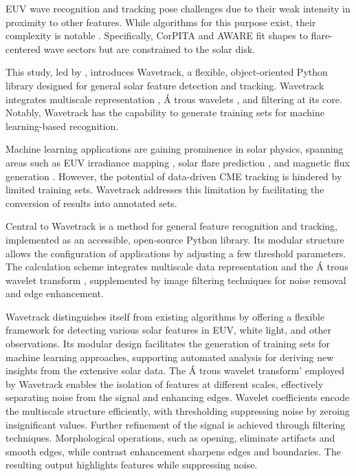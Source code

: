 EUV wave recognition and tracking pose challenges due to their weak intensity in proximity to other features. While algorithms for this purpose exist, their complexity is notable \citep{podladchikova_2005, verbeeck_2014, long_2014, ireland_2019}. Specifically, CorPITA \citep{long_2014} and AWARE \citep{ireland_2019} fit shapes to flare-centered wave sectors but are constrained to the solar disk.

This study, led by \citet{stepanyuk_2022}, introduces Wavetrack, a flexible, object-oriented Python library designed for general solar feature detection and tracking. Wavetrack integrates multiscale representation \citep{starck_2002}, \'A trous wavelets \citep{akansu_1991, holschneider_1989}, and filtering at its core. Notably, Wavetrack has the capability to generate training sets for machine learning-based recognition.

Machine learning applications are gaining prominence in solar physics, spanning areas such as EUV irradiance mapping \citep{szenicer_2019}, solar flare prediction \citep{li_2013}, and magnetic flux generation \citep{kim_2019}. However, the potential of data-driven CME tracking is hindered by limited training sets. Wavetrack addresses this limitation by facilitating the conversion of results into annotated sets.

Central to Wavetrack is a method for general feature recognition and tracking, implemented as an accessible, open-source Python library. Its modular structure allows the configuration of applications by adjusting a few threshold parameters. The calculation scheme integrates multiscale data representation \citep{starck_2002} and the \'A trous wavelet transform \citep{akansu_1991, holschneider_1989}, supplemented by image filtering techniques for noise removal and edge enhancement.

Wavetrack distinguishes itself from existing algorithms by offering a flexible framework for detecting various solar features in EUV, white light, and other observations. Its modular design facilitates the generation of training sets for machine learning approaches, supporting automated analysis for deriving new insights from the extensive solar data. The \'A trous wavelet transform' employed by Wavetrack enables the isolation of features at different scales, effectively separating noise from the signal and enhancing edges. Wavelet coefficients encode the multiscale structure efficiently, with thresholding suppressing noise by zeroing insignificant values. Further refinement of the signal is achieved through filtering techniques. Morphological operations, such as opening, eliminate artifacts and smooth edges, while contrast enhancement sharpens edges and boundaries. The resulting output highlights features while suppressing noise.

